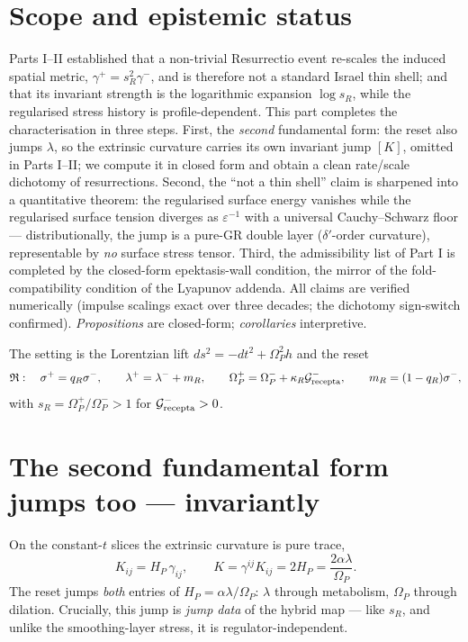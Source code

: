\documentclass[11pt,a4paper,oneside]{book}
\newcommand{\Op}{\Omega_P}
\newcommand{\Grec}{\mathcal G_{\rm recepta}}
\newcommand{\reset}{\mathfrak{R}}
\newcommand{\sR}{s_R}
\newcommand{\mR}{m_R}
\newcommand{\Kj}{[K]}
\theoremstyle{plain}
\theoremstyle{definition}
\theoremstyle{remark}
\begin{document}
\section*{Scope and epistemic status}
Parts I--II established that a non-trivial Resurrectio event re-scales the induced spatial metric,
$\gamma^+=\sR^2\gamma^-$, and is therefore not a standard Israel thin shell; and that its invariant
strength is the logarithmic expansion $\log\sR$, while the regularised stress history is
profile-dependent. This part completes the characterisation in three steps. First, the
\emph{second} fundamental form: the reset also jumps $\lambda$, so the extrinsic curvature carries its
own invariant jump $\Kj$, omitted in Parts I--II; we compute it in closed form and obtain a clean
rate/scale dichotomy of resurrections. Second, the ``not a thin shell'' claim is sharpened into a
quantitative theorem: the regularised surface energy vanishes while the regularised surface tension
diverges as $\varepsilon^{-1}$ with a universal Cauchy--Schwarz floor --- distributionally, the jump is a
pure-GR double layer ($\delta'$-order curvature), representable by \emph{no} surface stress tensor.
Third, the admissibility list of Part I is completed by the closed-form epektasis-wall condition, the
mirror of the fold-compatibility condition of the Lyapunov addenda. All claims are verified numerically
(impulse scalings exact over three decades; the dichotomy sign-switch confirmed). \emph{Propositions}
are closed-form; \emph{corollaries} interpretive.

The setting is the Lorentzian lift $ds^2=-dt^2+\Op^2h$ and the reset
\begin{equation}
\reset:\quad \sigma^+=q_R\sigma^-,\qquad
\lambda^+=\lambda^-+\mR,\qquad
\Op^+=\Op^-+\kappa_R\Grec^-,\qquad
\mR=(1-q_R)\sigma^-,
\end{equation}
with $\sR=\Op^+/\Op^->1$ for $\Grec^->0$.

\section{The second fundamental form jumps too --- invariantly}

On the constant-$t$ slices the extrinsic curvature is pure trace,
\begin{equation}
K_{ij}=H_P\,\gamma_{ij},\qquad
K=\gamma^{ij}K_{ij}=2H_P=\frac{2\alpha\lambda}{\Op}.
\end{equation}
The reset jumps \emph{both} entries of $H_P=\alpha\lambda/\Op$: $\lambda$ through metabolism, $\Op$
through dilation. Crucially, this jump is \emph{jump data} of the hybrid map --- like $\sR$, and unlike
the smoothing-layer stress, it is regulator-independent.
\end{document}
